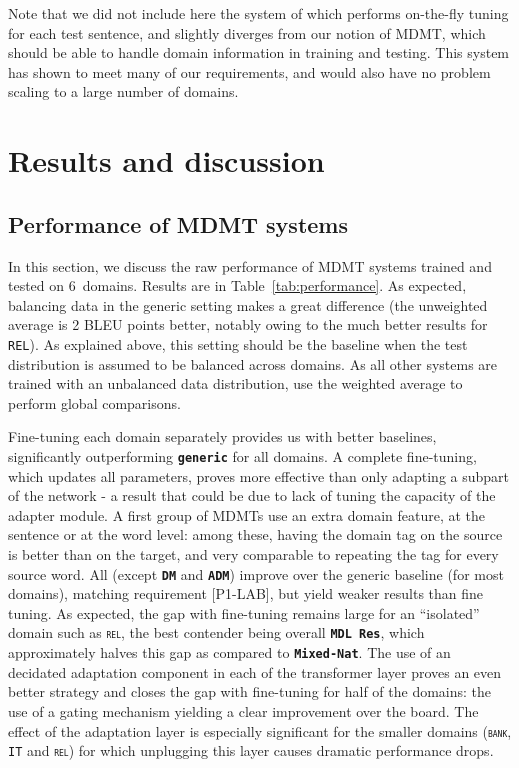 \documentclass[11pt]{article}
\newcommand{\fyTodo}[1]{\Todo[FY:]{\textcolor{orange}{#1}}}
\newcommand{\fyDone}[1]{\done[FY]\Todo[FY:]{\textcolor{orange}{#1}}}
\newcommand{\jcDone}[1]{\done[JC]\Todo[JC:]{\textcolor{blue}{#1}}}
\newcommand{\domain}[1]{\texttt{\textsc{#1}}}
\newcommand{\system}[1]{\texttt{\textbf{#1}}}
\begin{document}
Note that we did not include here the system of \cite{Farajian17multidomain} which performs on-the-fly tuning for each test sentence, and slightly diverges from our notion of MDMT, which should be able to handle domain information in training and testing. This system has shown to meet many of our requirements, and would also have no problem scaling to a large number of domains.\fyTodo{TBC}

\section{Results and discussion \label{sec:results}}
\subsection{Performance of MDMT systems \label{ssec:rawperformance}}
In this section, we discuss the raw performance of MDMT systems trained and tested on 6~domains. Results are in Table~\ref{tab:performance}. As expected, balancing data in the generic setting makes a great difference (the unweighted average is 2 BLEU points \jcDone{BP?} better, notably owing to the much better results for \domain{REL}). As explained above, this setting should be the baseline when the test distribution is assumed to be balanced across domains. As all other systems are trained with an unbalanced data distribution, use the weighted average to perform global comparisons.

Fine-tuning each domain separately provides us with better baselines, significantly outperforming \system{generic} for all domains. A complete fine-tuning, which updates all parameters, proves more effective than only adapting a subpart of the network - a result that could be due to lack of tuning the capacity of the adapter module. \fyDone{Add 2 averages ?}
A  first group of MDMTs use an extra domain feature, at the sentence or at the word level: among these, having the domain tag on the source is better than on the target, and very comparable to repeating the tag for every source word. All (except \system{DM} and \system{ADM}) improve over the generic baseline (for most domains), matching requirement [P1-LAB], but yield weaker results than fine tuning. As expected, the gap with fine-tuning remains large for an ``isolated'' domain such as \domain{rel}, the best contender being overall \system{MDL Res}, which approximately halves this gap as compared to \system{Mixed-Nat}.
\fyTodo{More comments when we have all the results}
The use of an decidated adaptation component in each of the transformer layer proves an even better strategy and closes the gap with fine-tuning for half of the domains: the use of a gating mechanism yielding a clear improvement over the board. The effect of the adaptation layer is especially significant for the smaller domains (\domain{bank}, \domain{IT} and \domain{rel}) for which unplugging this layer causes dramatic performance drops. 
\end{document}
